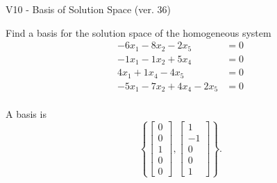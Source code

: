 \begin{exercise}
  \begin{exerciseTitle}V10 - Basis of Solution Space (ver. 36)\end{exerciseTitle}
  \begin{exerciseStatement}
    Find a basis for the solution space of the homogeneous system 
\begin{align*}
 -6 x_ 1 -8 x_ 2 -2 x_ 5 &= 0  \\ 
  -1 x_ 1 -1 x_ 2 + 5 x_ 4 &= 0  \\ 
  4 x_ 1 + 1 x_ 4 -4 x_ 5 &= 0  \\ 
  -5 x_ 1 -7 x_ 2 + 4 x_ 4 -2 x_ 5 &= 0  \\ 
 \end{align*}


 
  \end{exerciseStatement}

  \begin{exerciseAnswer}
   A basis is   
\[\left\{\left[\begin{array}{c}
0 \\
0 \\
1 \\
0 \\
0
\end{array}\right] , \left[\begin{array}{c}
1 \\
-1 \\
0 \\
0 \\
1
\end{array}\right]\right\}.\]

  


  \end{exerciseAnswer}
\end{exercise}